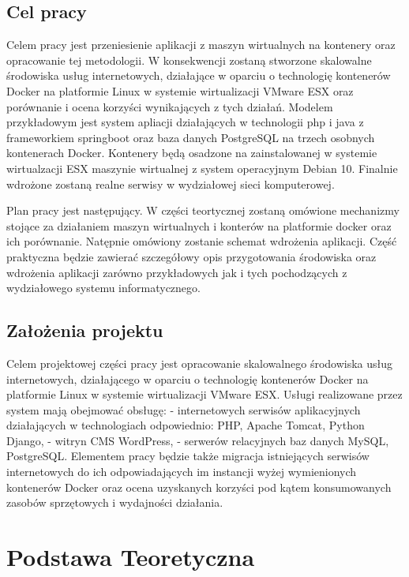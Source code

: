 \documentclass[polish, a4paper, 12pt, oneside]{book}
\begin{document}
\section{Cel pracy}
Celem pracy jest przeniesienie aplikacji z maszyn wirtualnych na kontenery oraz opracowanie tej metodologii. W konsekwencji zostaną stworzone skalowalne środowiska usług internetowych, działające w oparciu o technologię kontenerów Docker na platformie Linux w systemie wirtualizacji VMware ESX oraz porównanie i ocena korzyści wynikających z tych działań. Modelem przykładowym jest system apliacji działających w technologii php i java z frameworkiem springboot oraz baza danych PostgreSQL na trzech osobnych kontenerach Docker. Kontenery będą osadzone na zainstalowanej w systemie wirtualzacji ESX maszynie wirtualnej z system operacyjnym Debian 10. Finalnie wdrożone zostaną realne serwisy w wydziałowej sieci komputerowej.

Plan pracy jest następujący. W części teortycznej zostaną omówione mechanizmy stojące za działaniem maszyn wirtualnych i konterów na platformie docker oraz ich porównanie. Natępnie omówiony zostanie schemat wdrożenia aplikacji. Część praktyczna będzie zawierać szczegółowy opis przygotowania środowiska oraz wdrożenia aplikacji zarówno przykładowych jak i tych pochodzących z wydziałowego systemu informatycznego. 

\section{Założenia projektu}
Celem projektowej części pracy jest opracowanie skalowalnego środowiska usług internetowych, działającego w oparciu o technologię kontenerów Docker na platformie Linux w systemie wirtualizacji VMware ESX. Usługi realizowane przez system mają obejmować obsługę: - internetowych serwisów aplikacyjnych działających w technologiach odpowiednio: PHP, Apache Tomcat, Python Django, - witryn CMS WordPress, - serwerów relacyjnych baz danych MySQL, PostgreSQL. Elementem pracy będzie także migracja istniejących serwisów internetowych do ich odpowiadających im instancji wyżej wymienionych kontenerów Docker oraz ocena uzyskanych korzyści pod kątem konsumowanych zasobów sprzętowych i wydajności działania. 

\chapter{Podstawa Teoretyczna}
\end{document}
